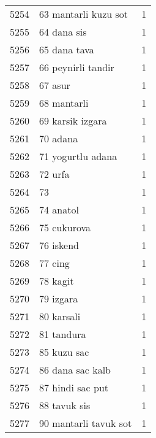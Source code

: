 \begin{tabular}{llr}
5254 &                               63 mantarli kuzu sot &      1 \\
5255 &                                        64 dana sis &      1 \\
5256 &                                       65 dana tava &      1 \\
5257 &                                 66 peynirli tandir &      1 \\
5258 &                                            67 asur &      1 \\
5259 &                                        68 mantarli &      1 \\
5260 &                                   69 karsik izgara &      1 \\
5261 &                                           70 adana &      1 \\
5262 &                                  71 yogurtlu adana &      1 \\
5263 &                                            72 urfa &      1 \\
5264 &                                                 73 &      1 \\
5265 &                                          74 anatol &      1 \\
5266 &                                        75 cukurova &      1 \\
5267 &                                          76 iskend &      1 \\
5268 &                                            77 cing &      1 \\
5269 &                                           78 kagit &      1 \\
5270 &                                          79 izgara &      1 \\
5271 &                                         80 karsali &      1 \\
5272 &                                         81 tandura &      1 \\
5273 &                                        85 kuzu sac &      1 \\
5274 &                                   86 dana sac kalb &      1 \\
5275 &                                   87 hindi sac put &      1 \\
5276 &                                       88 tavuk sis &      1 \\
5277 &                              90 mantarli tavuk sot &      1 \\

\end{tabular}
